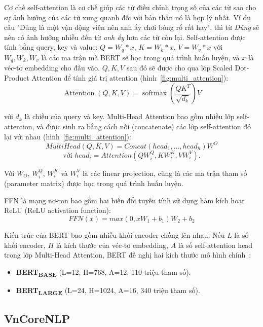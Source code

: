 Cơ chế self-attention là cơ chế giúp các từ điều chỉnh trọng số của các từ sao
cho sự ảnh hưởng của các từ xung quanh đối với bản thân nó là hợp lý nhất. Ví
dụ câu "Dũng là một vận động viên nên anh ấy chơi bóng rổ rất hay", thì từ
\textit{Dũng} sẽ nên có ảnh hưởng nhiều đến từ \textit{anh ấy} hơn các từ còn
lại. Self-attention được tính bằng query, key và value: $Q = W_q * x$, $K = W_k
* x$, $V = W_v * x$ với $W_q, W_k, W_v$ là các ma trận mà BERT sẽ học trong quá
trình huấn luyện, và $x$ là véc-tơ embedding cho đầu vào. $Q, K, V$ sau đó sẽ
được cho qua lớp Scaled Dot-Product Attention để tính giá trị attention
(hình~\ref{fig:multi_attention}):
\[ \operatorname{Attention}(Q, K, V)=\operatorname{softmax}\left(\frac{Q
K^{T}}{\sqrt{d_{k}}}\right) V \]

với $d_k$ là chiều của query và key. Multi-Head Attention bao gồm nhiều lớp
self-attention, và được sinh ra bằng cách nối (concatenate) các lớp
self-attention đó lại với nhau (hình~\ref{fig:multi_attention}):
\[ MultiHead(Q,K,V) = Concat(head_1,...,head_h)W^O \]
\[ \text{với } head_i = Attention(QW_i^Q, KW_i^K, VW_i^V). \]

Với $W_O$, $W_i^Q$, $W_i^K$ và $W_i^V$ là các linear projection, cũng là các ma
trận tham số (parameter matrix) được học trong quá trình huấn luyện.


FFN là mạng nơ-ron bao gồm hai biến đổi tuyến tính sử dụng hàm kích hoạt ReLU
(ReLU activation function):
\[ FFN(x) = max(0,xW_1 + b_1)W_2 + b_2 \]

Kiến trúc của BERT bao gồm nhiều khối encoder chồng lên nhau. Nếu $L$ là số
khối encoder, $H$ là kích thước của véc-tơ embedding, $A$ là số self-attention
head trong lớp Multi-Head Attention, BERT đề nghị hai kích thước mô hình
chính~\cite{devlinBERTPretrainingDeep2019}:
\begin{itemize}
	\item \textbf{BERT\textsubscript{BASE}} (L=12, H=768, A=12, 110 triệu tham
		số).
	\item \textbf{BERT\textsubscript{LARGE}} (L=24, H=1024, A=16, 340 triệu
		tham số).
\end{itemize}


\subsection{VnCoreNLP}
